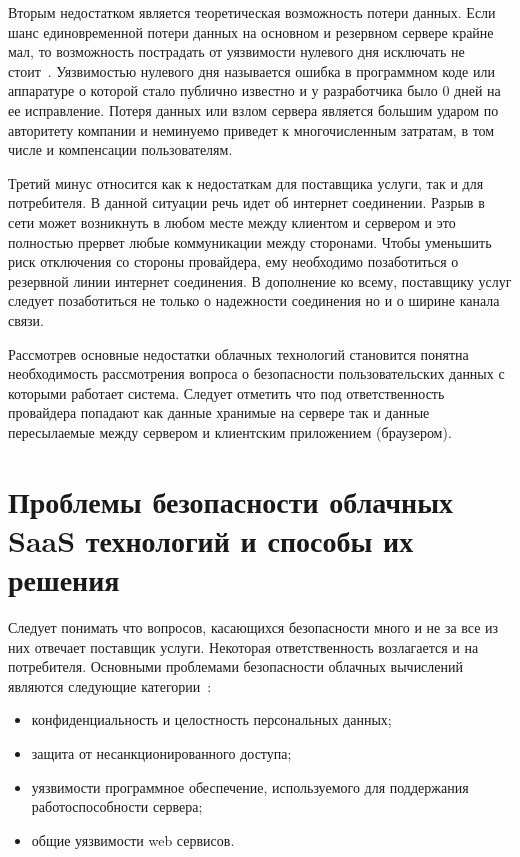 Вторым недостатком является теоретическая возможность потери данных. Если шанс единовременной потери данных на основном и резервном сервере крайне мал, то возможность пострадать от уязвимости нулевого дня исключать не стоит~\cite{amoroso2013enterprise}. Уязвимостью нулевого дня называется ошибка в программном коде или аппаратуре о которой стало публично известно и у разработчика было 0 дней на ее исправление. Потеря данных или взлом сервера является большим ударом по авторитету компании и неминуемо приведет к многочисленным затратам, в том числе и  компенсации пользователям.

Третий минус относится как к недостаткам для поставщика услуги, так и для потребителя. В данной ситуации речь идет об интернет соединении. Разрыв в сети может возникнуть в любом месте между клиентом и сервером и это полностью прервет любые коммуникации между сторонами. Чтобы уменьшить риск отключения со стороны провайдера, ему необходимо позаботиться о резервной линии интернет соединения. В дополнение ко всему, поставщику услуг следует позаботиться не только о надежности соединения но и о ширине канала связи.

Рассмотрев основные недостатки облачных технологий становится понятна необходимость рассмотрения вопроса о безопасности пользовательских данных с которыми работает система. Следует отметить что под ответственность провайдера попадают как данные хранимые на сервере так и данные пересылаемые между сервером и клиентским приложением (браузером).

\section{Проблемы безопасности облачных SaaS технологий и способы их решения}

Следует понимать что вопросов, касающихся безопасности много и не за все из них отвечает поставщик услуги. Некоторая ответственность возлагается и на потребителя.
Основными проблемами безопасности облачных вычислений являются следующие категории~\cite{khalil2014cloud}:

\begin{itemize}
	\item конфиденциальность и целостность персональных данных;
	\item защита от несанкционированного доступа;
	\item уязвимости программное обеспечение, используемого для поддержания работоспособности сервера;
	\item общие уязвимости web сервисов.
\end{itemize}

